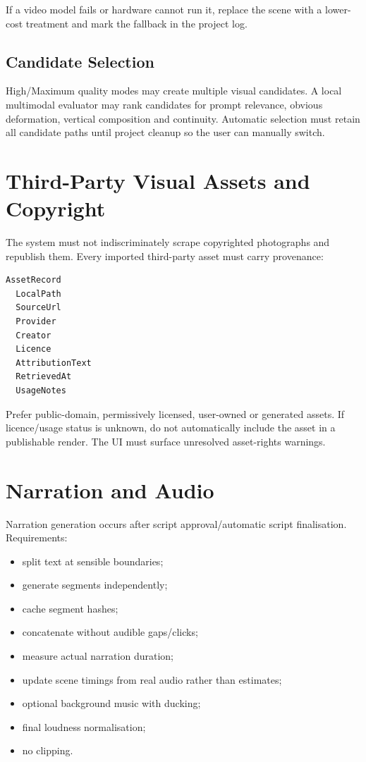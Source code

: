 \documentclass[10pt,journal,compsoc]{IEEEtran}
\begin{document}
If a video model fails or hardware cannot run it, replace the scene with a lower-cost treatment and mark the fallback in the project log.

\subsection{Candidate Selection}

High/Maximum quality modes may create multiple visual candidates. A local multimodal evaluator may rank candidates for prompt relevance, obvious deformation, vertical composition and continuity. Automatic selection must retain all candidate paths until project cleanup so the user can manually switch.

\section{Third-Party Visual Assets and Copyright}

The system must not indiscriminately scrape copyrighted photographs and republish them. Every imported third-party asset must carry provenance:
\begin{verbatim}
AssetRecord
  LocalPath
  SourceUrl
  Provider
  Creator
  Licence
  AttributionText
  RetrievedAt
  UsageNotes
\end{verbatim}

Prefer public-domain, permissively licensed, user-owned or generated assets. If licence/usage status is unknown, do not automatically include the asset in a publishable render. The UI must surface unresolved asset-rights warnings.

\section{Narration and Audio}

Narration generation occurs after script approval/automatic script finalisation. Requirements:
\begin{itemize}
    \item split text at sensible boundaries;
    \item generate segments independently;
    \item cache segment hashes;
    \item concatenate without audible gaps/clicks;
    \item measure actual narration duration;
    \item update scene timings from real audio rather than estimates;
    \item optional background music with ducking;
    \item final loudness normalisation;
    \item no clipping.
\end{itemize}
\end{document}
